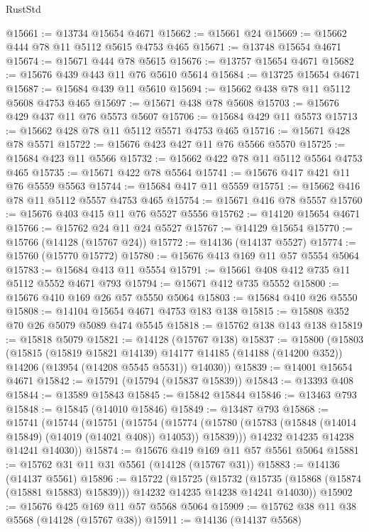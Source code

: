 \begin{lexlean}{RustStd}
\begin{coremodule}
@15661 := @13734 @15654 @4671
@15662 := @15661 @24
@15669 := @15662 @444 @78 @11 @5112 @5615 @4753 @465
@15671 := @13748 @15654 @4671
@15674 := @15671 @444 @78 @5615
@15676 := @13757 @15654 @4671
@15682 := @15676 @439 @443 @11 @76 @5610 @5614
@15684 := @13725 @15654 @4671
@15687 := @15684 @439 @11 @5610
@15694 := @15662 @438 @78 @11 @5112 @5608 @4753 @465
@15697 := @15671 @438 @78 @5608
@15703 := @15676 @429 @437 @11 @76 @5573 @5607
@15706 := @15684 @429 @11 @5573
@15713 := @15662 @428 @78 @11 @5112 @5571 @4753 @465
@15716 := @15671 @428 @78 @5571
@15722 := @15676 @423 @427 @11 @76 @5566 @5570
@15725 := @15684 @423 @11 @5566
@15732 := @15662 @422 @78 @11 @5112 @5564 @4753 @465
@15735 := @15671 @422 @78 @5564
@15741 := @15676 @417 @421 @11 @76 @5559 @5563
@15744 := @15684 @417 @11 @5559
@15751 := @15662 @416 @78 @11 @5112 @5557 @4753 @465
@15754 := @15671 @416 @78 @5557
@15760 := @15676 @403 @415 @11 @76 @5527 @5556
@15762 := @14120 @15654 @4671
@15766 := @15762 @24 @11 @24 @5527
@15767 := @14129 @15654
@15770 := @15766 (@14128 (@15767 @24))
@15772 := @14136 (@14137 @5527)
@15774 := @15760 (@15770 @15772)
@15780 := @15676 @413 @169 @11 @57 @5554 @5064
@15783 := @15684 @413 @11 @5554
@15791 := @15661 @408 @412 @735 @11 @5112 @5552 @4671 @793
@15794 := @15671 @412 @735 @5552
@15800 := @15676 @410 @169 @26 @57 @5550 @5064
@15803 := @15684 @410 @26 @5550
@15808 := @14104 @15654 @4671 @4753 @183 @138
@15815 := @15808 @352 @70 @26 @5079 @5089 @474 @5545
@15818 := @15762 @138 @143 @138
@15819 := @15818 @5079
@15821 := @14128 (@15767 @138)
@15837 := @15800
    (@15803
      (@15815
        (@15819 @15821 @14139)
        @14177
        @14185
        (@14188 (@14200 @352))
        @14206
        (@13954 (@14208 @5545 @5531))
        @14030))
@15839 := @14001 @15654 @4671
@15842 := @15791 (@15794 (@15837 @15839))
@15843 := @13393 @408
@15844 := @13589 @15843
@15845 := @15842 @15844
@15846 := @13463 @793
@15848 := @15845 (@14010 @15846)
@15849 := @13487 @793
@15868 := @15741
    (@15744
      (@15751
        (@15754
          (@15774 (@15780 (@15783 (@15848 (@14014 @15849) (@14019 (@14021 @408)) @14053)) @15839)))
        @14232
        @14235
        @14238
        @14241
        @14030))
@15874 := @15676 @419 @169 @11 @57 @5561 @5064
@15881 := @15762 @31 @11 @31 @5561 (@14128 (@15767 @31))
@15883 := @14136 (@14137 @5561)
@15896 := @15722
    (@15725
      (@15732 (@15735 (@15868 (@15874 (@15881 @15883) @15839))) @14232 @14235 @14238 @14241 @14030))
@15902 := @15676 @425 @169 @11 @57 @5568 @5064
@15909 := @15762 @38 @11 @38 @5568 (@14128 (@15767 @38))
@15911 := @14136 (@14137 @5568)

\end{coremodule}
\end{lexlean}
